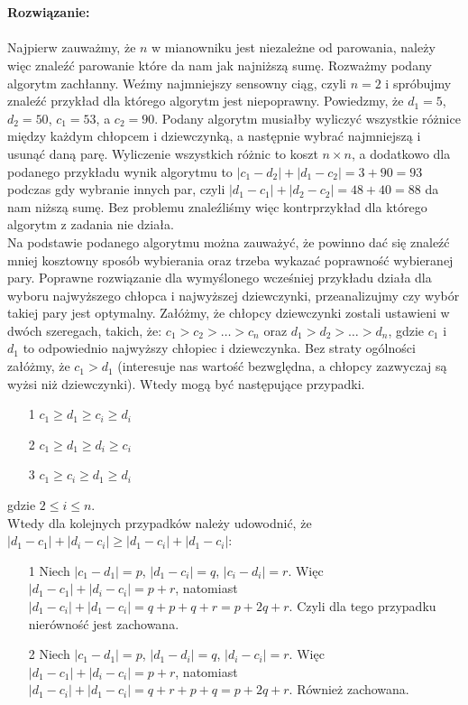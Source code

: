 \documentclass[10pt]{article}%
\newcommand{\beginsolution}{\textbf{\\~\\ \textbf{Rozwiązanie:} \\~\\}}
\begin{document}
\begin{enumerate}
\beginsolution
Najpierw zauważmy, że $n$ w mianowniku jest niezależne od parowania, należy więc znaleźć parowanie które da nam jak najniższą sumę. Rozważmy podany algorytm zachłanny. Weźmy najmniejszy sensowny ciąg, czyli $n=2$ i spróbujmy znaleźć przykład dla którego algorytm jest niepoprawny. Powiedzmy, że $d_1 = 5$, $d_2 = 50$, $c_1 = 53$, a $c_2 = 90$. Podany algorytm musiałby wyliczyć wszystkie różnice między każdym chłopcem i dziewczynką, a następnie wybrać najmniejszą i usunąć daną parę. Wyliczenie wszystkich różnic to koszt $n \times n$, a dodatkowo dla podanego przykładu wynik algorytmu to $|c_1 - d_2| + |d_1 - c_2|  = 3 + 90 = 93$ podczas gdy wybranie innych par, czyli $|d_1 - c_1| + |d_2 - c_2| = 48 + 40 = 88$ da nam niższą sumę. Bez problemu znaleźliśmy więc kontrprzykład dla którego algorytm z zadania nie działa. \\
Na podstawie podanego algorytmu można zauważyć, że powinno dać się znaleźć mniej kosztowny sposób wybierania oraz trzeba wykazać poprawność wybieranej pary. Poprawne rozwiązanie dla wymyślonego wcześniej przykładu działa dla wyboru najwyższego chłopca i najwyższej dziewczynki, przeanalizujmy czy wybór takiej pary jest optymalny. Załóżmy, że chłopcy dziewczynki zostali ustawieni w dwóch szeregach, takich, że: $ c_1 > c_2 > \ldots > c_n $ oraz $ d_1 > d_2 > \ldots > d_n $, gdzie $c_1$ i $d_1$ to odpowiednio najwyższy chłopiec i dziewczynka. Bez straty ogólności załóżmy, że $c_1 > d_1$ (interesuje nas wartość bezwględna, a chłopcy zazwyczaj są wyżsi niż dziewczynki). Wtedy mogą być następujące przypadki. 
\begin{itemize}
\item[1] $ c_1 \geq d_1 \geq c_i \geq d_i $
\item[2] $ c_1 \geq d_1 \geq d_i \geq c_i $
\item[3] $ c_1 \geq c_i \geq d_1 \geq d_i $
\end{itemize}
gdzie $ 2 \leq i \leq n$.\\
Wtedy dla kolejnych przypadków należy udowodnić, że $|d_1 - c_1| + |d_i - c_i| \geq |d_1 - c_i| + |d_1 - c_i|$:
\begin{itemize}
\item[1] Niech $|c_1 - d_1| = p$, $|d_1 - c_i| = q$, $|c_i - d_i| = r$. Więc $|d_1 - c_1| + |d_i - c_i| = p + r$, natomiast $|d_1 - c_i| + |d_1 - c_i| = q + p + q + r = p + 2q +r$. Czyli dla tego przypadku nierówność jest zachowana.
\item[2] Niech $|c_1 - d_1| = p$, $|d_1 - d_i| = q$, $|d_i - c_i| = r$. Więc $|d_1 - c_1| + |d_i - c_i| = p + r$, natomiast $|d_1 - c_i| + |d_1 - c_i| = q + r + p + q = p + 2q +r$. Również zachowana.

\end{itemize}
\end{enumerate}
\end{document}
